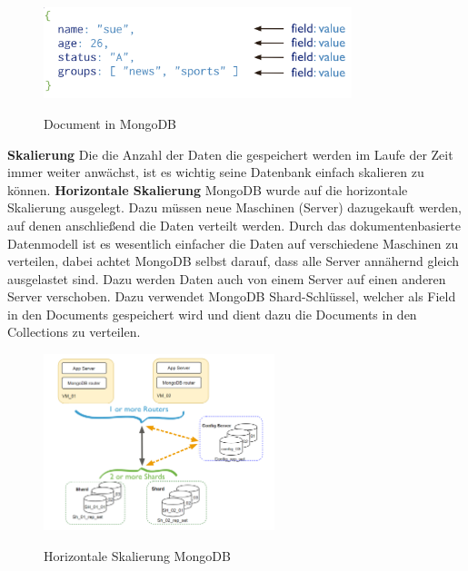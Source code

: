 \begin{figure}[h!]
    \centering
    \includegraphics[width=0.8\textwidth]{pics/document.png}
    \caption{Document in MongoDB}
    \cite{mongodb_document}
    \label{fig:enter-label}
\end{figure}

\textbf{Skalierung}
\newline
Die die Anzahl der Daten die gespeichert werden im Laufe der Zeit immer weiter anwächst, ist es wichtig seine Datenbank einfach skalieren zu können. 
\newline
\textbf{Horizontale Skalierung}
\newline
MongoDB wurde auf die horizontale Skalierung ausgelegt. Dazu müssen neue Maschinen (Server) dazugekauft werden, auf denen anschließend die Daten verteilt werden. Durch das dokumentenbasierte Datenmodell ist es wesentlich einfacher die Daten auf verschiedene Maschinen zu verteilen, dabei achtet MongoDB selbst darauf, dass alle Server annähernd gleich ausgelastet sind. Dazu werden Daten auch von einem Server auf einen anderen Server verschoben. Dazu verwendet MongoDB Shard-Schlüssel, welcher als Field in den Documents gespeichert wird und dient dazu die Documents in den Collections zu verteilen.
\cite{mongodb_collections}
\begin{figure}[h!]
    \centering
    \includegraphics[width=0.6\textwidth]{pics/vertical_scaling_mongodb.png}
    \caption{Horizontale Skalierung MongoDB}
    \cite{vertical_scaling_mongodb}
    \label{fig:enter-label}
\end{figure}
\newline
